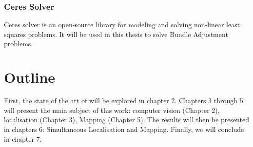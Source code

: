 \subsubsection{Ceres Solver}
Ceres solver is an open-source library for modeling and solving non-linear least squares problems. It will be used in this thesis to solve Bundle Adjustment problems.



\section{Outline}
First, the state of the art of %
will be explored in chapter 2. Chapters 3 through 5 will present the main subject of this work: computer vision (Chapter 2), localisation (Chapter 3), Mapping (Chapter 5). The results will then be presented in chapters 6: Simultaneous Localisation and Mapping. Finally, we will conclude in chapter 7.
